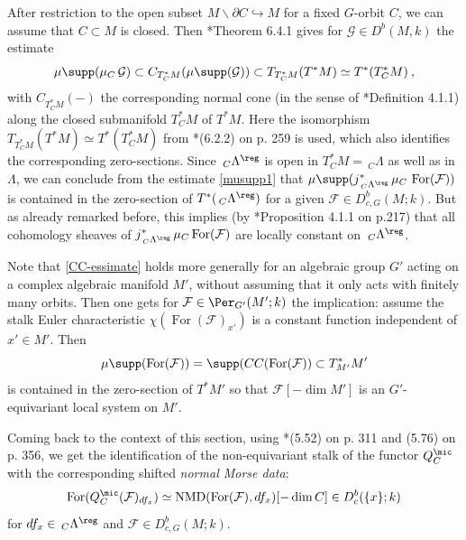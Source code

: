 \documentclass[11pt,letterpaper]{amsart}
\numberwithin{equation}{section}
\begin{document}
After restriction to the open subset $M\backslash \partial C \hookrightarrow M$ for a fixed $G$-orbit $C$, we can assume that $C\subset M$ is closed.
Then \cite{KaS94}*{Theorem 6.4.1} gives for  $\mathcal{G}\in D^b(M,k)$ the estimate
$$\mu \supp(\mu_C\, \mathcal{G}) \subset C_{T^*_CM}(\mu \supp(\mathcal{G}))\subset T_{T^*_CM}(T^*M) \simeq T^*(T^*_CM)\:, $$
with $C_{T^*_CM}(-)$ the corresponding normal cone (in the sense of \cite{KaS94}*{Definition 4.1.1}) along the closed submanifold $T^*_CM$ of $T^*M$.
Here the isomorphism $T_{T^*_CM}(T^*M) \simeq T^*(T^*_CM)$ from \cite{KaS94}*{(6.2.2) on p. 259} is used, which also identifies  the corresponding zero-sections. Since $\,_C\Lambda^\reg$ is open in $T^*_CM=\,_C\Lambda$ 
as well as in $\Lambda$, we can conclude from the estimate
\eqref{musupp1} that $\mu \supp(j^*_{\,_C\Lambda^\reg}\,\mu_C\,\operatorname{For}(\mathcal{F}) )$ is contained in the zero-section of 
$T^*(\,_C\Lambda^\reg)$ for a given
 $\mathcal{F}\in D^b_{c,G}(M;k)$.
But as already remarked before, this implies (by \cite{Sch03}*{Proposition 4.1.1 on p.217}) that
all cohomology sheaves of $j^*_{\,_C\Lambda^\reg}\,\mu_C\operatorname{For}(\mathcal{F})$ are locally constant on $\,_C\Lambda^\reg$.

\begin{remark}\label{rem:lc}
 Note that  \eqref{CC-essimate} holds more generally for an algebraic group $G'$ acting on a complex algebraic manifold $M'$, without assuming that it only acts with finitely many orbits. Then one gets for  $\mathcal{F}\in \Per_{G'}(M';k)$ the implication: assume the stalk Euler characteristic 
 $\chi(\operatorname{For}(\mathcal{F})_{x'}) $
 is a constant function independent of $x'\in M'$. Then
 $$\mu\supp(\operatorname{For}(\mathcal{F})) =
 \supp(CC(\operatorname{For}(\mathcal{F})) \subset T^*_{M'}M'$$
 is contained in the zero-section of $T^*M'$ so that
 $\mathcal{F}[-\dim M']$  is an $G'$-equivariant local system on $M'$.
\end{remark}

Coming back to the context of this section, using \cite{Sch03}*{(5.52) on p. 311 and (5.76) on p. 356}, we get the identification of the non-equivariant stalk of the functor 
$Q^\mic_C$ with the corresponding shifted {\it normal Morse data}:
\begin{equation}\label{Qmic=NMD}
\operatorname{For}(Q^\mic_C (\mathcal{F})_{df_x})\simeq   \operatorname{NMD}(\operatorname{For}(\mathcal{F}),df_x)[-\dim C]\in D^b_{c}(\{x\};k)
\end{equation}
for $df_x\in \,_C\Lambda^\reg$ and $\mathcal{F}\in D^b_{c,G}(M;k)$.
\end{document}
